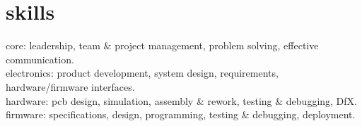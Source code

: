 
\section{skills}
  \vspace{-0.2cm}

{\headingfont core}: leadership, team \& project management, problem solving, effective communication.\\
{\headingfont electronics}: product development, system design, requirements, hardware/firmware interfaces.\\
{\headingfont hardware}: pcb design, simulation, assembly \& rework, testing \& debugging, DfX. \\
{\headingfont firmware}: specifications, design, programming, testing \& debugging, deployment.